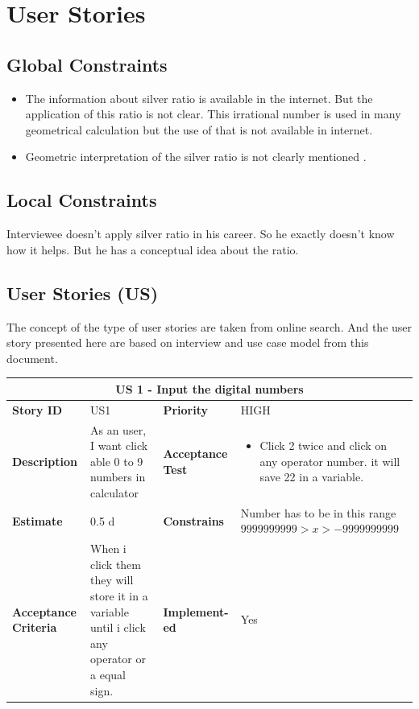 \documentclass{article}
\begin{document}
\section{User Stories}
\subsection{Global Constraints}
\begin{itemize}
  \item The information about silver ratio is available in the internet. But the application of this ratio is not clear. This irrational number is used in many geometrical calculation but the use of that is not available in internet. 
  \item Geometric interpretation of the silver ratio is not clearly mentioned \cite{jdc_silver}.
\end{itemize}

\subsection{Local Constraints}
Interviewee doesn't apply silver ratio in his career. So he exactly doesn't know how it helps. But he has a conceptual idea about the ratio. 

\subsection{User Stories (US)}
The concept of the type of user stories are taken from online search\cite{js_story,cal_story}. And the user story presented here are based on interview and use case model from this document. \newline

\begin{tabular}{ |p{2cm}|p{5cm}|p{2cm}|p{4cm}| }
 \hline
 \multicolumn{4}{|c|}{US 1 - Input the digital numbers} \\
 \hline
 \textbf {Story ID}& US1 &  \textbf{Priority} & HIGH \\
 \hline
  \textbf{Description}   & As an user, I want click able 0 to 9 numbers in calculator &    \textbf{Acceptance Test}& 
\begin{itemize}
\item Click 2 twice and click on any operator number. it will save 22 in a variable.
\end{itemize}
  \\
 \hline
 \textbf{Estimate} & 0.5 d &  \textbf{Constrains}& Number has to be in this range $9999999999>x>-9999999999$  \\
 \hline
 \textbf{Acceptance Criteria} & When i click them they will store it in a variable until i click any operator or a equal sign.  &  \textbf{Implement- ed}& Yes  \\
 \hline
\end{tabular}
\end{document}

